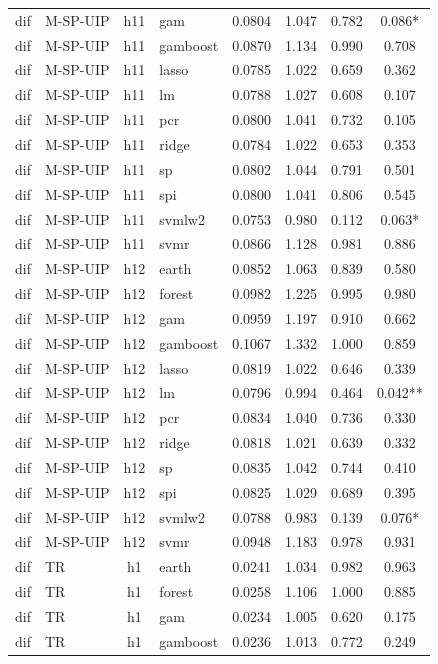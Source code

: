 \begin{ThreePartTable}
\begin{longtable}[t]{llclcccc}
dif & M-SP-UIP & h11 & gam & 0.0804 & 1.047 & 0.782 & 0.086*\\
dif & M-SP-UIP & h11 & gamboost & 0.0870 & 1.134 & 0.990 & 0.708\\
dif & M-SP-UIP & h11 & lasso & 0.0785 & 1.022 & 0.659 & 0.362\\
dif & M-SP-UIP & h11 & lm & 0.0788 & 1.027 & 0.608 & 0.107\\
dif & M-SP-UIP & h11 & pcr & 0.0800 & 1.041 & 0.732 & 0.105\\
dif & M-SP-UIP & h11 & ridge & 0.0784 & 1.022 & 0.653 & 0.353\\
dif & M-SP-UIP & h11 & sp & 0.0802 & 1.044 & 0.791 & 0.501\\
dif & M-SP-UIP & h11 & spi & 0.0800 & 1.041 & 0.806 & 0.545\\
dif & M-SP-UIP & h11 & svmlw2 & 0.0753 & 0.980 & 0.112 & 0.063*\\
dif & M-SP-UIP & h11 & svmr & 0.0866 & 1.128 & 0.981 & 0.886\\
\addlinespace
dif & M-SP-UIP & h12 & earth & 0.0852 & 1.063 & 0.839 & 0.580\\
dif & M-SP-UIP & h12 & forest & 0.0982 & 1.225 & 0.995 & 0.980\\
dif & M-SP-UIP & h12 & gam & 0.0959 & 1.197 & 0.910 & 0.662\\
dif & M-SP-UIP & h12 & gamboost & 0.1067 & 1.332 & 1.000 & 0.859\\
dif & M-SP-UIP & h12 & lasso & 0.0819 & 1.022 & 0.646 & 0.339\\
dif & M-SP-UIP & h12 & lm & 0.0796 & 0.994 & 0.464 & 0.042**\\
dif & M-SP-UIP & h12 & pcr & 0.0834 & 1.040 & 0.736 & 0.330\\
dif & M-SP-UIP & h12 & ridge & 0.0818 & 1.021 & 0.639 & 0.332\\
dif & M-SP-UIP & h12 & sp & 0.0835 & 1.042 & 0.744 & 0.410\\
dif & M-SP-UIP & h12 & spi & 0.0825 & 1.029 & 0.689 & 0.395\\
dif & M-SP-UIP & h12 & svmlw2 & 0.0788 & 0.983 & 0.139 & 0.076*\\
dif & M-SP-UIP & h12 & svmr & 0.0948 & 1.183 & 0.978 & 0.931\\
\addlinespace
dif & TR & h1 & earth & 0.0241 & 1.034 & 0.982 & 0.963\\
dif & TR & h1 & forest & 0.0258 & 1.106 & 1.000 & 0.885\\
dif & TR & h1 & gam & 0.0234 & 1.005 & 0.620 & 0.175\\
dif & TR & h1 & gamboost & 0.0236 & 1.013 & 0.772 & 0.249\\

\end{longtable}
\end{ThreePartTable}

